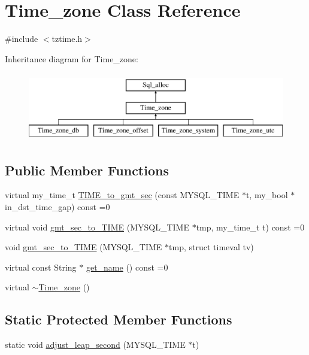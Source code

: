 \hypertarget{classTime__zone}{}\section{Time\+\_\+zone Class Reference}
\label{classTime__zone}


{\ttfamily \#include $<$tztime.\+h$>$}

Inheritance diagram for Time\+\_\+zone\+:\begin{figure}[H]
\begin{center}
\leavevmode
\includegraphics[height=3.000000cm]{classTime__zone}
\end{center}
\end{figure}
\subsection*{Public Member Functions}
\begin{DoxyCompactItemize}
\item 
virtual my\+\_\+time\+\_\+t \mbox{\hyperlink{classTime__zone_a980bb1d59fe04e899b116169f1b3166d}{T\+I\+M\+E\+\_\+to\+\_\+gmt\+\_\+sec}} (const M\+Y\+S\+Q\+L\+\_\+\+T\+I\+ME $\ast$t, my\+\_\+bool $\ast$in\+\_\+dst\+\_\+time\+\_\+gap) const =0
\item 
virtual void \mbox{\hyperlink{classTime__zone_a7a15d4406de10928f8e39eb3549770a4}{gmt\+\_\+sec\+\_\+to\+\_\+\+T\+I\+ME}} (M\+Y\+S\+Q\+L\+\_\+\+T\+I\+ME $\ast$tmp, my\+\_\+time\+\_\+t t) const =0
\item 
void \mbox{\hyperlink{classTime__zone_ad85fc28fafc5f23927ba05e971bf0169}{gmt\+\_\+sec\+\_\+to\+\_\+\+T\+I\+ME}} (M\+Y\+S\+Q\+L\+\_\+\+T\+I\+ME $\ast$tmp, struct timeval tv)
\item 
virtual const String $\ast$ \mbox{\hyperlink{classTime__zone_a8116436f7b8e19dc4b99cd78a786e47f}{get\+\_\+name}} () const =0
\item 
virtual \mbox{\hyperlink{classTime__zone_aa7cb98bc25ec10a5ebb4ef2aa6879318}{$\sim$\+Time\+\_\+zone}} ()
\end{DoxyCompactItemize}
\subsection*{Static Protected Member Functions}
\begin{DoxyCompactItemize}
\item 
static void \mbox{\hyperlink{classTime__zone_a62b31cd34f3f770890fee2abfec7245c}{adjust\+\_\+leap\+\_\+second}} (M\+Y\+S\+Q\+L\+\_\+\+T\+I\+ME $\ast$t)
\end{DoxyCompactItemize}
